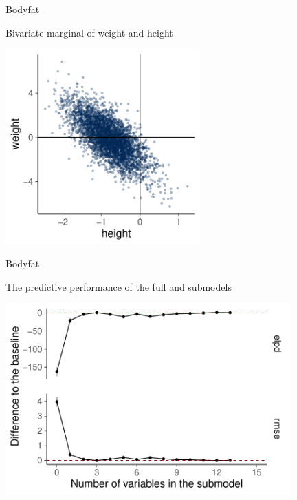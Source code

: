 \documentclass[english,t]{beamer}
\begin{document}
\begin{frame}{Bodyfat}

  \vspace{-0.55\baselineskip}
  Bivariate marginal of weight and height
  
  \includegraphics[width=7.5cm]{bodyfat_mcmc_scatter.pdf}

\end{frame}

\begin{frame}{Bodyfat}

  \vspace{-0.55\baselineskip}
  The predictive performance of the full and submodels
  
  \includegraphics[width=11cm]{bodyfat_varsel_plot.pdf}

\end{frame}
\end{document}
